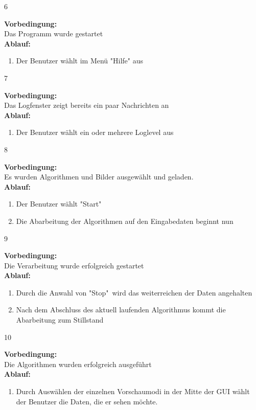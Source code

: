 {{{\begin{enumerate}
			\end{enumerate}
		}
		{6}{
			\textbf{Vorbedingung:}\\
			Das Programm wurde gestartet
			\\\textbf{Ablauf:}
			\begin{enumerate}
				\item Der Benutzer wählt im Menü "{}Hilfe" aus
			\end{enumerate}
		}
		{7}{
			\textbf{Vorbedingung:}\\
			Das Logfenster zeigt bereits ein paar Nachrichten an
			\\\textbf{Ablauf:}
			\begin{enumerate}
				\item Der Benutzer wählt ein oder mehrere Loglevel aus
			\end{enumerate}
		}
		{8}{
			\textbf{Vorbedingung:}\\
			Es wurden Algorithmen und Bilder ausgewählt und geladen.
			\\\textbf{Ablauf:}
			\begin{enumerate}
				\item Der Benutzer wählt "{}Start"
				\item Die Abarbeitung der Algorithmen auf den Eingabedaten beginnt nun
			\end{enumerate}
		}
		{9}{
			\textbf{Vorbedingung:}\\
			Die Verarbeitung wurde erfolgreich gestartet
			\\\textbf{Ablauf:}
			\begin{enumerate}
				\item Durch die Anwahl von "{}Stop" wird das weiterreichen der Daten angehalten
				\item Nach dem Abschluss des aktuell laufenden Algorithmus kommt die Abarbeitung zum Stillstand
			\end{enumerate}
		}
		{10}{
			\textbf{Vorbedingung:}\\
			Die Algorithmen wurden erfolgreich ausgeführt
			\\\textbf{Ablauf:}
			\begin{enumerate}
				\item Durch Auswählen der einzelnen Vorschaumodi in der Mitte der GUI wählt der Benutzer die Daten, die er sehen möchte.
			\end{enumerate}
		}
	}	
}